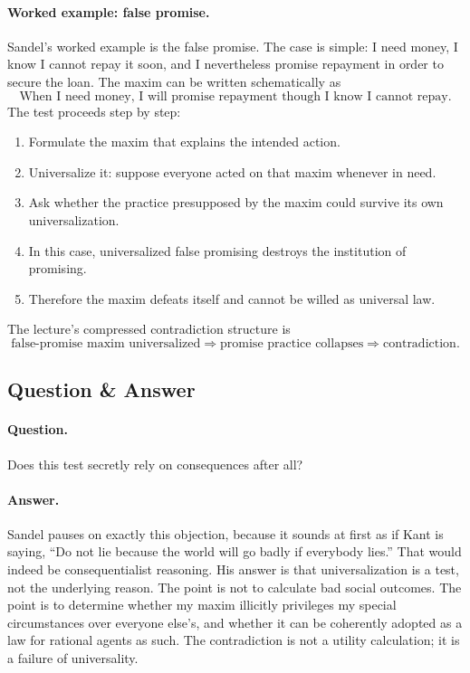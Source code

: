 \paragraph{Worked example: false promise.} Sandel's worked example is the false promise. The case is simple: I need money, I know I cannot repay it soon, and I nevertheless promise repayment in order to secure the loan. The maxim can be written schematically as
\begin{equation}
\text{When I need money, I will promise repayment though I know I cannot repay.}
\end{equation}
The test proceeds step by step:
\begin{enumerate}
\item Formulate the maxim that explains the intended action.
\item Universalize it: suppose everyone acted on that maxim whenever in need.
\item Ask whether the practice presupposed by the maxim could survive its own universalization.
\item In this case, universalized false promising destroys the institution of promising.
\item Therefore the maxim defeats itself and cannot be willed as universal law.
\end{enumerate}
The lecture's compressed contradiction structure is
\begin{equation}
\text{false-promise maxim universalized} \Longrightarrow \text{promise practice collapses} \Longrightarrow \text{contradiction}.
\end{equation}

\subsection{Question \& Answer}

\paragraph{Question.} Does this test secretly rely on consequences after all?

\paragraph{Answer.} Sandel pauses on exactly this objection, because it sounds at first as if Kant is saying, ``Do not lie because the world will go badly if everybody lies.'' That would indeed be consequentialist reasoning. His answer is that universalization is a test, not the underlying reason. The point is not to calculate bad social outcomes. The point is to determine whether my maxim illicitly privileges my special circumstances over everyone else's, and whether it can be coherently adopted as a law for rational agents as such. The contradiction is not a utility calculation; it is a failure of universality.

